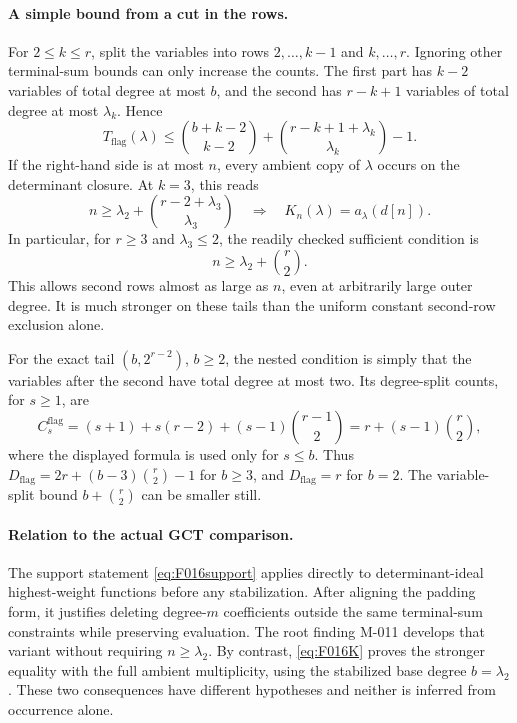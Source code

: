 \paragraph{A simple bound from a cut in the rows.}
For \(2\leq k\leq r\), split the variables into rows
\(2,\ldots,k-1\) and \(k,\ldots,r\). Ignoring other
terminal-sum bounds can only increase the counts. The first
part has \(k-2\) variables of total degree at most \(b\),
and the second has \(r-k+1\) variables of total degree at
most \(\lambda_k\). Hence
\begin{equation}\label{eq:F016cut}
 T_{\mathrm{flag}}(\lambda)
 \leq \binom{b+k-2}{k-2}
           +\binom{r-k+1+\lambda_k}{\lambda_k}-1.
\end{equation}
If the right-hand side is at most \(n\), every ambient
copy of \(\lambda\) occurs on the determinant closure.
At \(k=3\), this reads
\begin{equation}\label{eq:F016thirdrow}
 n\geq\lambda_2+\binom{r-2+\lambda_3}{\lambda_3}
             \quad\Longrightarrow\quad K_n(\lambda)=a_\lambda(d[n]).
\end{equation}
In particular, for \(r\geq3\) and \(\lambda_3\leq2\),
the readily checked sufficient condition is
\[
                       n\geq\lambda_2+\binom r2.
\]
This allows second rows almost as large as \(n\), even at
arbitrarily large outer degree. It is much stronger on these
tails than the uniform constant second-row exclusion alone.

For the exact tail \((b,2^{r-2})\), \(b\geq2\), the nested
condition is simply that the variables after the second have
total degree at most two. Its degree-split counts, for \(s\geq1\),
are
\[
 C_s^{\mathrm{flag}}
  =(s+1)+s(r-2)+(s-1)\binom{r-1}{2}
  =r+(s-1)\binom r2,
\]
where the displayed formula is used only for \(s\leq b\).
Thus \(D_{\mathrm{flag}}=2r+(b-3)\binom r2-1\) for
\(b\geq3\), and \(D_{\mathrm{flag}}=r\) for \(b=2\).
The variable-split bound \(b+\binom r2\) can be smaller still.

\paragraph{Relation to the actual GCT comparison.}
The support statement \eqref{eq:F016support} applies directly
to determinant-ideal highest-weight functions before any
stabilization. After aligning the padding form, it justifies
deleting degree-\(m\) coefficients outside the same terminal-sum
constraints while preserving evaluation. The root finding
M-011 develops that variant without requiring \(n\geq\lambda_2\).
By contrast, \eqref{eq:F016K} proves the stronger equality
with the full ambient multiplicity, using the stabilized base
degree \(b=\lambda_2\). These two consequences have different
hypotheses and neither is inferred from occurrence alone.

